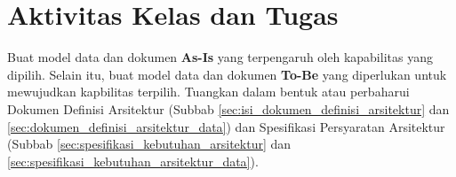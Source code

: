 \section{Aktivitas Kelas dan Tugas}
Buat model data dan dokumen \textbf{As-Is} yang terpengaruh oleh kapabilitas yang dipilih. Selain itu, buat model data dan dokumen \textbf{To-Be} yang diperlukan untuk mewujudkan kapbilitas terpilih. Tuangkan dalam bentuk atau perbaharui Dokumen Definisi Arsitektur (Subbab \ref{sec:isi_dokumen_definisi_arsitektur} dan \ref{sec:dokumen_definisi_arsitektur_data}) dan Spesifikasi Persyaratan Arsitektur (Subbab \ref{sec:spesifikasi_kebutuhan_arsitektur} dan  \ref{sec:spesifikasi_kebutuhan_arsitektur_data}).
